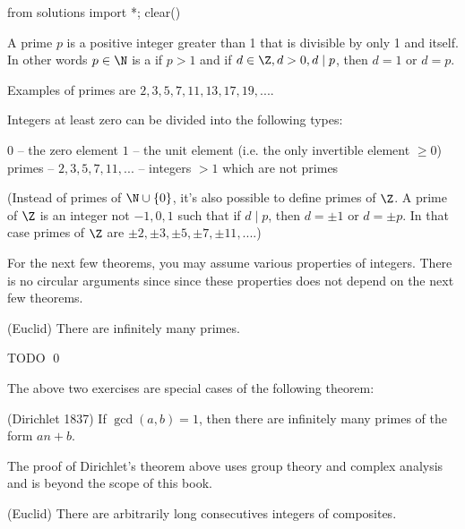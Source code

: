 \begin{python0}
from solutions import *; clear()
\end{python0}

\begin{defn}
A prime $p$ is a positive integer greater than 1 that is
divisible by only 1 and itself.
In other words $p \in \N$ is a
if $p > 1$ and 
if $d \in \Z, d > 0, d \mid p$, then $d = 1$ or $d = p$.
\end{defn}

Examples of primes are $2, 3, 5, 7, 11, 13, 17, 19, ...$.

Integers at least zero can be divided into the following types:
\begin{enumerate}[nosep]
  \li $0$ -- the zero element
  \li $1$ -- the unit element (i.e. the only invertible element $\geq 0$)
  \li primes -- $2, 3, 5, 7, 11, ...$
  \li {} -- integers $> 1$ which are not primes 
\end{enumerate}

(Instead of primes of $\N \cup \{0\}$,
it's also possible to define primes of $\Z$.
A prime of $\Z$ is an integer not $-1, 0, 1$
such that if $d \mid p$, then $d = \pm 1$ or $d = \pm p$.
In that case primes of $\Z$ are
$\pm 2, \pm 3, \pm 5, \pm 7, \pm 11, ...$.)


For the next few theorems,
you may assume various properties of integers.
There is no circular arguments since since these properties
does not depend on the next few theorems.

\begin{prop} \textnormal{(Euclid)}
  There are infinitely many primes.
\end{prop}

\proof
TODO
\qed






The above two exercises are special cases of the following theorem:

\begin{thm} \textnormal{(Dirichlet 1837)}
If $\gcd(a, b) = 1$, then there are infinitely many primes
of the form $an + b$.
\end{thm}

The proof of Dirichlet's theorem above uses group theory and
complex analysis and is beyond the scope of this book.

\begin{prop} \textnormal{(Euclid)}
  There are arbitrarily long consecutives integers of composites.
\end{prop}

